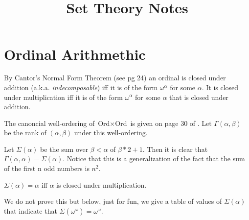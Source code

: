 \documentclass[oneside,12pt]{amsart}
\begin{document}
\title{Set Theory Notes}

\maketitle

\tableofcontents

\section{Ordinal Arithmethic}

By Cantor's Normal Form Theorem (see \cite{Jech_Book2} pg 24) an ordinal
is closed under addition (a.k.a. \emph{indecomposable}) iff it is of the form
$\omega^{\alpha}$ for some $\alpha$. It is closed under multiplication iff
it is of the form $\omega^{\alpha}$ for some $\alpha$ that is closed under
addition.

The canoncial well-ordering of $\text{Ord} \times \text{Ord}$ is given
on page 30 of \cite{Jech_Book2}. Let $\Gamma(\alpha,\beta)$ be the rank
of $(\alpha,\beta)$ under this well-ordering.

Let $\Sigma(\alpha)$ be the sum over $\beta<\alpha$
of $\beta*2+1$. Then it is clear that $\Gamma(\alpha,\alpha) = \Sigma(\alpha)$.
Notice that this is a generalization of the fact that the sum of the first
n odd numbers is $n^2$.

\begin{lemma}
$\Sigma(\alpha) = \alpha$ iff $\alpha$ is closed under multiplication.
\end{lemma}

We do not prove this but below, just for fun, we give a table of values of
$\Sigma(\alpha)$ that indicate that $\Sigma(\omega^{\omega})=\omega^{\omega}$.
\end{document}
